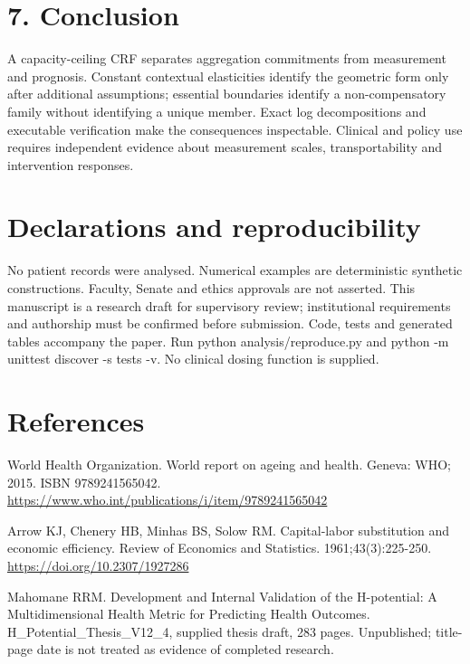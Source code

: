 \documentclass[11pt,a4paper]{article}
\begin{document}
\section*{7. Conclusion}
A capacity-ceiling CRF separates aggregation commitments from measurement and prognosis. Constant contextual elasticities identify the geometric form only after additional assumptions; essential boundaries identify a non-compensatory family without identifying a unique member. Exact log decompositions and executable verification make the consequences inspectable. Clinical and policy use requires independent evidence about measurement scales, transportability and intervention responses.

\section*{Declarations and reproducibility}
No patient records were analysed. Numerical examples are deterministic synthetic constructions. Faculty, Senate and ethics approvals are not asserted. This manuscript is a research draft for supervisory review; institutional requirements and authorship must be confirmed before submission. Code, tests and generated tables accompany the paper. Run python analysis/reproduce.py and python -m unittest discover -s tests -v. No clinical dosing function is supplied.

\section*{References}
\begin{list}{}{\setlength{\leftmargin}{2em}\setlength{\itemindent}{-2em}\setlength{\itemsep}{0.3\baselineskip}}\small
\item [1] World Health Organization. World report on ageing and health. Geneva: WHO; 2015. ISBN 9789241565042. \url{https://www.who.int/publications/i/item/9789241565042}
\item [2] Arrow KJ, Chenery HB, Minhas BS, Solow RM. Capital-labor substitution and economic efficiency. Review of Economics and Statistics. 1961;43(3):225-250. \url{https://doi.org/10.2307/1927286}
\item [3] Mahomane RRM. Development and Internal Validation of the H-potential: A Multidimensional Health Metric for Predicting Health Outcomes. H\_Potential\_Thesis\_V12\_4, supplied thesis draft, 283 pages. Unpublished; title-page date is not treated as evidence of completed research.
\end{list}
\end{document}
